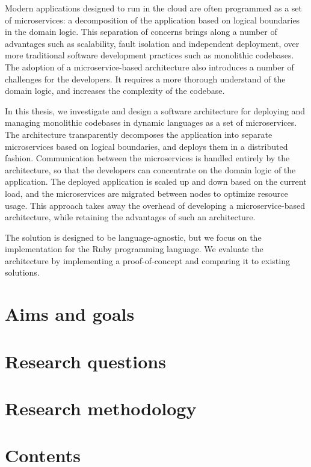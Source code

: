 \documentclass[12pt]{article}
\begin{document}
	Modern applications designed to run in the cloud are often programmed as a set of microservices: a decomposition of the application based on logical boundaries in the domain logic.
	This separation of concerns brings along a number of advantages such as scalability, fault isolation and independent deployment, over more traditional software development practices such as monolithic codebases.
	The adoption of a microservice-based architecture also introduces a number of challenges for the developers.
	It requires a more thorough understand of the domain logic, and increases the complexity of the codebase.

	In this thesis, we investigate and design a software architecture for deploying and managing monolithic codebases in dynamic languages as a set of microservices.
	The architecture transparently decomposes the application into separate microservices based on logical boundaries, and deploys them in a distributed fashion.
	Communication between the microservices is handled entirely by the architecture, so that the developers can concentrate on the domain logic of the application.
	The deployed application is scaled up and down based on the current load, and the microservices are migrated between nodes to optimize resource usage.
	This approach takes away the overhead of developing a microservice-based architecture, while retaining the advantages of such an architecture.

	The solution is designed to be language-agnostic, but we focus on the implementation for the Ruby programming language.
	We evaluate the architecture by implementing a proof-of-concept and comparing it to existing solutions.

	\clearpage

	\section{Aims and goals}\label{sec:aims-and-goals}

	\clearpage

	\section{Research questions}\label{sec:research-questions}

	\clearpage

	\section{Research methodology}\label{sec:research-methodology}

	\clearpage

	\section{Contents}\label{sec:contents}

	\clearpage


	\nocite{*}

	\printbibliography[heading=bibintoc]
\end{document}
